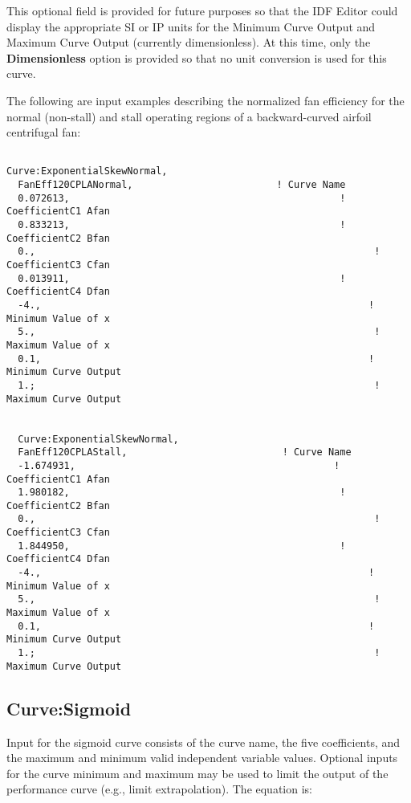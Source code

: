 This optional field is provided for future purposes so that the IDF Editor could display the appropriate SI or IP units for the Minimum Curve Output and Maximum Curve Output (currently dimensionless). At this time, only the \textbf{Dimensionless} option is provided so that no unit conversion is used for this curve.

The following are input examples describing the normalized fan efficiency for the normal (non-stall) and stall operating regions of a backward-curved airfoil centrifugal fan:

\begin{lstlisting}

Curve:ExponentialSkewNormal,
  FanEff120CPLANormal,                         ! Curve Name
  0.072613,                                               ! CoefficientC1 Afan
  0.833213,                                               ! CoefficientC2 Bfan
  0.,                                                           ! CoefficientC3 Cfan
  0.013911,                                               ! CoefficientC4 Dfan
  -4.,                                                         ! Minimum Value of x
  5.,                                                           ! Maximum Value of x
  0.1,                                                         ! Minimum Curve Output
  1.;                                                           ! Maximum Curve Output


  Curve:ExponentialSkewNormal,
  FanEff120CPLAStall,                           ! Curve Name
  -1.674931,                                             ! CoefficientC1 Afan
  1.980182,                                               ! CoefficientC2 Bfan
  0.,                                                           ! CoefficientC3 Cfan
  1.844950,                                               ! CoefficientC4 Dfan
  -4.,                                                         ! Minimum Value of x
  5.,                                                           ! Maximum Value of x
  0.1,                                                         ! Minimum Curve Output
  1.;                                                           ! Maximum Curve Output
\end{lstlisting}

\subsection{Curve:Sigmoid}\label{curvesigmoid}

Input for the sigmoid curve consists of the curve name, the five coefficients, and the maximum and minimum valid independent variable values. Optional inputs for the curve minimum and maximum may be used to limit the output of the performance curve (e.g., limit extrapolation). The equation is:

